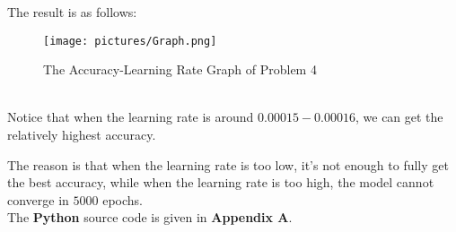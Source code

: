 \documentclass{article}
\begin{document}
The result is as follows: \\

\quad 

\vspace{-0.6cm}\begin{figure}[H]
    \centering
    \texttt{[image: pictures/Graph.png]}
    \caption{The Accuracy-Learning Rate Graph of Problem 4}
    \label{fig:ROC}
\end{figure}\vspace{-0.6cm} 

\quad \\

Notice that when the learning rate is around $0.00015 - 0.00016$, we can get the relatively highest accuracy. 

The reason is that when the learning rate is too low, it's not enough to fully get the best accuracy, while when the learning rate is too high, the model cannot converge in $5000$ epochs.\\

The \textbf{Python} source code is given in \textbf{Appendix A}.
\end{document}

